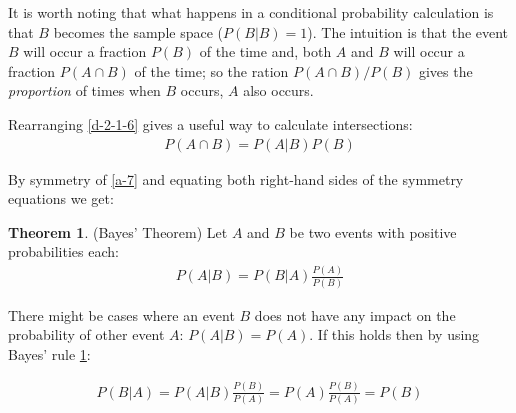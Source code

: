 \documentclass[
  oneside,
  11pt, a4paper,
  footinclude=true,
  headinclude=true,
  cleardoublepage=empty
]{scrbook}
\theoremstyle{definition}
\theoremstyle{definition}
\newtheorem{theorem}{Theorem}[section]
\begin{document}
        It is worth noting that what happens in a conditional probability calculation is that $B$ becomes the sample space ($P(B|B) = 1$). The intuition is that the event $B$ will occur a fraction $P(B)$ of the time and, both $A$ and $B$ will occur a fraction $P(A \cap B)$ of the time; so the ration $P(A \cap B)/P(B)$ gives the \emph{proportion} of times when $B$ occurs, $A$ also occurs.
        
        Rearranging \ref{d-2-1-6} gives a useful way to calculate intersections:
        \begin{align}\label{a-7}
           P(A \cap B) = P(A|B)P(B) 
        \end{align}{}
        
        By symmetry of \ref{a-7} and equating both right-hand sides of the symmetry equations we get:
        
        \begin{theorem}{(Bayes' Theorem) Let $A$ and $B$ be two events with positive probabilities each:}\label{t-bayes}
            \begin{align*}
                P(A|B) = P(B|A)\frac{P(A)}{P(B)}
            \end{align*}{}
        \end{theorem}{}
        
        There might be cases where an event $B$ does not have any impact on the probability of other event $A$: $P(A|B) = P(A)$. If this holds then by using Bayes' rule \ref{t-bayes}:
        
        \begin{align*}
            P(B|A) = P(A|B)\frac{P(B)}{P(A)} = P(A)\frac{P(B)}{P(A)} = P(B)
        \end{align*}{}
        
        
        
        
\end{document}
